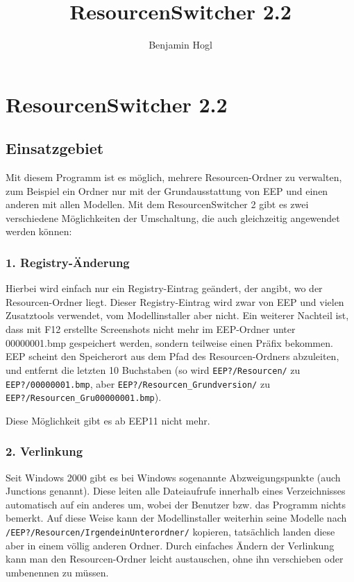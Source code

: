 \documentclass[a4paper,12pt,headings=normal]{scrreprt}
\title{ResourcenSwitcher 2.2}
\author{Benjamin Hogl}
\begin{document}
\chapter*{ResourcenSwitcher 2.2}
\thispagestyle{fancy}
\section*{Einsatzgebiet}
Mit diesem Programm ist es möglich, mehrere Resourcen-Ordner zu verwalten, zum Beispiel ein Ordner nur mit der Grundausstattung von EEP und einen anderen mit allen Modellen. Mit dem ResourcenSwitcher 2 gibt es zwei verschiedene Möglichkeiten der Umschaltung, die auch gleichzeitig angewendet werden können:



\subsection*{1. Registry-Änderung}
Hierbei wird einfach nur ein Registry-Eintrag geändert, der angibt, wo der Resourcen-Ordner liegt. Dieser Registry-Eintrag wird zwar von EEP und vielen Zusatztools verwendet, vom Modellinstaller aber nicht. Ein weiterer Nachteil ist, dass mit F12 erstellte Screenshots nicht mehr im EEP-Ordner unter 00000001.bmp gespeichert werden, sondern teilweise einen Präfix bekommen. EEP scheint den Speicherort aus dem Pfad des Resourcen-Ordners abzuleiten, und entfernt die letzten 10 Buchstaben (so wird \texttt{EEP?/Resourcen/} zu \texttt{EEP?/00000001.bmp}, aber \texttt{EEP?/Resourcen\_Grundversion/} zu \texttt{EEP?/Resourcen\_Gru00000001.bmp}).

Diese Möglichkeit gibt es ab EEP11 nicht mehr.

\subsection*{2. Verlinkung}
Seit Windows 2000 gibt es bei Windows sogenannte Abzweigungspunkte (auch Junctions genannt). Diese leiten alle Dateiaufrufe innerhalb eines Verzeichnisses automatisch auf ein anderes um, wobei der Benutzer bzw. das Programm nichts bemerkt. Auf diese Weise kann der Modellinstaller weiterhin seine Modelle nach \texttt{/EEP?/Resourcen/IrgendeinUnterordner/} kopieren, tatsächlich landen diese aber in einem völlig anderen Ordner. Durch einfaches Ändern der Verlinkung kann man den Resourcen-Ordner leicht austauschen, ohne ihn verschieben oder umbenennen zu müssen.
\end{document}
